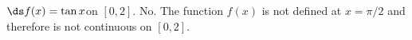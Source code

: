 {$\ds f(x) = \tan x$\quad  on \quad $[0,2]$.
}
{No.  The function $f(x)$ is not defined at $x=\pi/2$ and therefore is not continuous on $[0,2]$.
}
